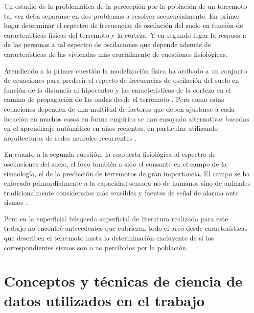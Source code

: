 \documentclass[a4paper]{report}
\begin{document}
Un estudio de la problemática de la percecpión por la población de un terremoto tal vez deba separarse en dos problemas a resolver secuencialmente.
En primer lugar determinar el espectro de frecuencias de oscilación del suelo en función de características físicas del terremoto y la corteza.
Y en segundo lugar la respuesta de las personas a tal espectro de oscilaciones que depende además de características de las viviendas más crucialmente de cuestiones fisiológicas.

Atendiendo a la primer cuestión la modelización física ha arribado a un conjunto de ecuaciones para predecir el especto de frecuencias de oscilación del suelo en función de la distancia al hipocentro y las características de la corteza en el camino de propagación de las ondas desde el terremoto \cite{lior_relation_2018}.
Pero como estas ecuaciones dependen de una multitud de factores que deben ajustarse a cada locación en muchos casos en forma empírica se han ensayado alternativas basadas en el aprendizaje autómático en años recientes, en particular utilizando arquitecturas de redes neuroles recurrentes \cite{datta_deepshake_2022}.

En cuanto a la segunda cuestión, la respuesta fisiológica al espectro de oscilaciones del suelo, el foco también a sido el consante en el campo de la sismología, el de la predicción de terremotos de gran importancia.
El campo se ha enfocado primordialmente a la capacidad sensora no de humanos sino de animales tradicionalmente considerados más sensibles y fuentes de señal de alarma ante sismos \cite{kirschvink_earthquake_2000}.

Pero en la superficial búsqueda superficial de literatura realizada para este trabajo no encontré antecedentes que cubrieran todo el arco desde características que describen el terremoto hasta la determinación excluyente de si los correspondientes sismos son o no percibidos por la población.


\section{Conceptos y técnicas de ciencia de datos utilizados en el trabajo}

\end{document}
